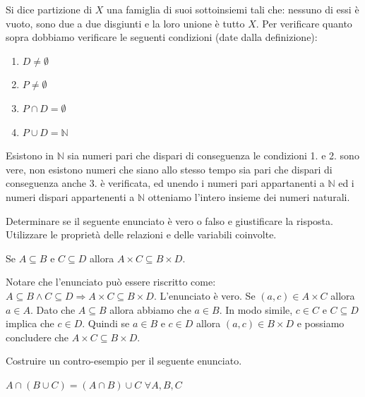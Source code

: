 \begin{soluzione}
Si dice partizione di $X$ una famiglia di suoi sottoinsiemi tali che: nessuno di essi è vuoto, sono due a due disgiunti e la loro unione è tutto $X$.
Per verificare quanto sopra dobbiamo verificare le seguenti condizioni (date dalla definizione):
\begin{enumerate}
    \item $D\neq \emptyset$
    \item $P\neq \emptyset$
    \item $P\cap D = \emptyset$
    \item $P\cup D= \mathbb{N}$
\end{enumerate}
Esistono in $\mathbb{N}$ sia numeri pari che dispari di conseguenza le condizioni 1. e 2. sono vere, non esistono numeri che siano allo stesso tempo sia pari che dispari di conseguenza anche 3. è verificata, ed unendo i numeri pari appartanenti a $\mathbb{N}$ ed i numeri dispari appartenenti a $\mathbb{N}$ otteniamo l'intero insieme dei numeri naturali. \\
\end{soluzione}


\begin{esercizio}
Determinare se il seguente enunciato è vero o falso e giustificare la risposta.
Utilizzare le proprietà delle relazioni e delle variabili coinvolte. 
\begin{center} 	 
    Se $A \subseteq B$ e $C \subseteq D$ allora $A \times C \subseteq B \times D$. 
\end{center}
\end{esercizio}

\begin{soluzione}
Notare che l'enunciato può essere riscritto come: $A \subseteq B \wedge C \subseteq D \Rightarrow A \times C \subseteq B \times D$.
L'enunciato è vero.  Se $(a,c) \in A \times C$ allora $a \in A$. Dato che $A \subseteq B$ allora abbiamo che $a \in B$. In modo simile, $c \in C$ e $C \subseteq D$ implica che $c \in D$. Quindi se $a \in B$ e $c \in D$ allora $(a,c) \in B \times D$ e possiamo concludere che $A \times C \subseteq B \times D$. \\
\end{soluzione}

\begin{esercizio}
Costruire un contro-esempio per il seguente enunciato. 
\begin{center}
    $A \cap (B \cup C) = (A \cap B) \cup C$ \hspace*{0,5cm} $\forall A, B, C$
\end{center}
\end{esercizio}

